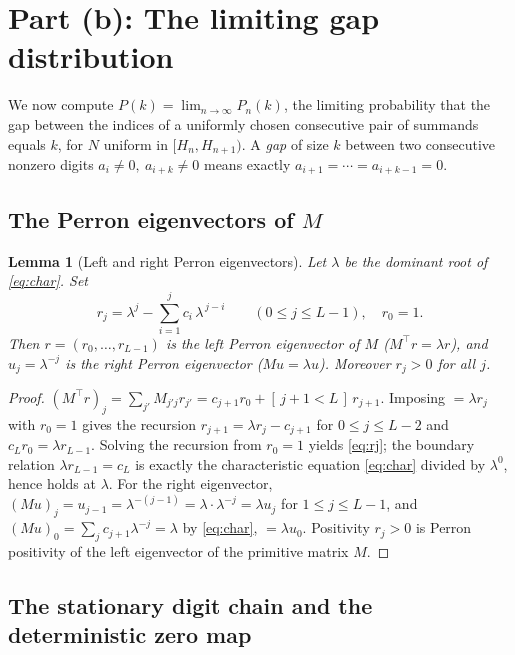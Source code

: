 \documentclass[12pt]{article}
\newtheorem{lemma}{Lemma}
\theoremstyle{definition}
\begin{document}
\section{Part (b): The limiting gap distribution}\label{sec:b}

We now compute $P(k)=\lim_{n\to\infty}P_n(k)$, the limiting probability that the
gap between the indices of a uniformly chosen consecutive pair of summands equals
$k$, for $N$ uniform in $[H_n,H_{n+1})$. A \emph{gap} of size $k$ between two
consecutive nonzero digits $a_i\neq0,\ a_{i+k}\neq0$ means exactly
$a_{i+1}=\cdots=a_{i+k-1}=0$.

\subsection{The Perron eigenvectors of $M$}

\begin{lemma}[Left and right Perron eigenvectors]\label{lem:eig}
Let $\lambda$ be the dominant root of \eqref{eq:char}. Set
\begin{equation}\label{eq:rj}
r_j=\lambda^{j}-\sum_{i=1}^{j}c_i\,\lambda^{\,j-i}\qquad(0\le j\le L-1),
\quad r_0=1 .
\end{equation}
Then $r=(r_0,\dots,r_{L-1})$ is the left Perron eigenvector of $M$
($M^{\!\top}r=\lambda r$), and $u_j=\lambda^{-j}$ is the right Perron eigenvector
($Mu=\lambda u$). Moreover $r_j>0$ for all $j$.
\end{lemma}

\begin{proof}
$(M^{\!\top}r)_j=\sum_{j'}M_{j'j}r_{j'}=c_{j+1}r_0+[\,j+1<L\,]\,r_{j+1}$.
Imposing $=\lambda r_j$ with $r_0=1$ gives the recursion
$r_{j+1}=\lambda r_j-c_{j+1}$ for $0\le j\le L-2$ and $c_Lr_0=\lambda r_{L-1}$.
Solving the recursion from $r_0=1$ yields \eqref{eq:rj}; the boundary relation
$\lambda r_{L-1}=c_L$ is exactly the characteristic equation \eqref{eq:char}
divided by $\lambda^{0}$, hence holds at $\lambda$. For the right eigenvector,
$(Mu)_j=u_{j-1}=\lambda^{-(j-1)}=\lambda\cdot\lambda^{-j}=\lambda u_j$ for
$1\le j\le L-1$, and $(Mu)_0=\sum_j c_{j+1}\lambda^{-j}=\lambda$ by
\eqref{eq:char}, $=\lambda u_0$. Positivity $r_j>0$ is Perron positivity of the
left eigenvector of the primitive matrix $M$.
\end{proof}

\subsection{The stationary digit chain and the deterministic zero map}
\end{document}
